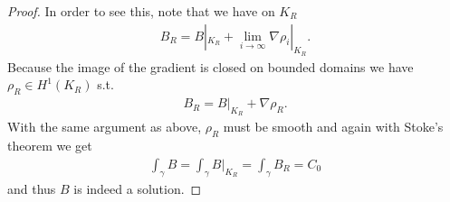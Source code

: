 \documentclass[12pt,a4paper]{article}
\numberwithin{equation}{subsection}
\numberwithin{lemma}{subsection}
\theoremstyle{definition}
\begin{document}
\begin{proof}
    In order to see this, note that we have on $K_R$
    \begin{align*}
        B_R = B|_{K_R} +\lim\limits_{i\rightarrow \infty}\nabla \rho_i|_{K_R}.
    \end{align*}
    Because the image of the gradient is closed on bounded domains 
    we have $\rho_R \in H^1(K_R)$ s.t.
    \begin{align*}
        B_R = B|_{K_R} + \nabla \rho_R.
    \end{align*}
    With the same argument as above, $\rho_R$ must be smooth and again with 
    Stoke's theorem we get
    \begin{align*}
        \int_\gamma B =  \int_\gamma B|_{K_R} =  \int_\gamma B_R = C_0
    \end{align*}
    and thus $B$ is indeed a solution.
\end{proof}
\end{document}
